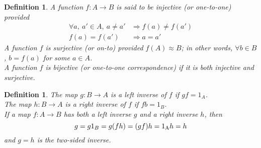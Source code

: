 \documentclass[a4paper,sfsidenotes,openany]{tufte-book}
\theoremstyle{theorem}
\newtheorem{definition}[theorem]{Definition}
\begin{document}
\begin{fullwidth}
\begin{definition}
A function $ f: A \rightarrow B$ is said to be \textit{{\color{blue} injective}} (or one-to-one) provided 
\begin{align}
\forall a, \ a' \in A, \ a \neq a' & \Rightarrow f(a) \neq f(a') \nonumber \\
f(a) = f(a') & \Rightarrow a = a' \nonumber
\end{align}
A function $ f $ is \textit{{\color{blue} surjective}} (or on-to) provided $ f(A) \approx B $; in other words, $\forall b \in B $, $ b=f(a) $ for some $ a \in A $.\\
A function $ f $ is \textit{{\color{blue} bijective}} (or one-to-one correspondence) if it is both injective and surjective.\\
\end{definition}
\>

\begin{definition}
The map $ g: B \rightarrow A $ is a \textit{{\color{blue} left inverse}} of $ f $ if $ gf = 1_A $.\\
The map $ h: B \rightarrow A $ is a \textit{{\color{blue} right inverse}} of $ f $ if $ fb = 1_B $.\\
If a map $ f: A \rightarrow B $ has both a left inverse $ g $ and a right inverse $ h $, then
\begin{equation}
g = g1_B = g(fh) = (gf)h = 1 \textsubscript{A} h = h
\nonumber	
\end{equation}
and $ g=h $ is the \textit{{\color{blue} two-sided inverse}}.\\
\end{definition}
\>

\end{fullwidth}


\newpage

\end{document}
